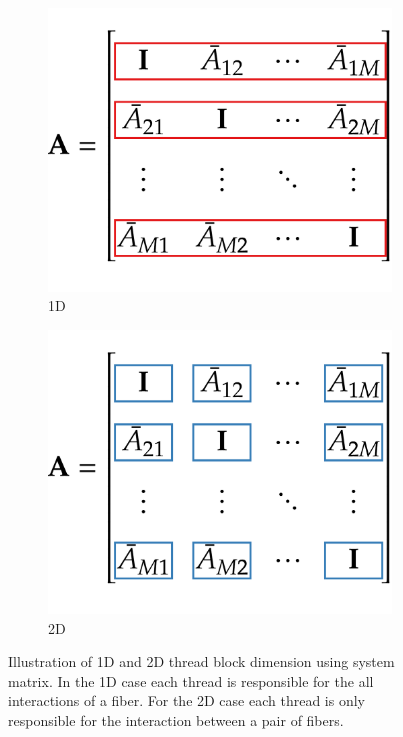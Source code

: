 \begin{figure}[!htbp]
  \centering
  \begin{subfigure}[h]{0.33\textwidth}
    \centering
    \includegraphics[width=\textwidth]{img/thread_block1D.pdf}
    \caption{1D}\label{fig:thread_block_1D}
  \end{subfigure}
  \begin{subfigure}[h]{0.33\textwidth}
    \centering
    \includegraphics[width=\textwidth]{img/thread_block2D.pdf}
    \caption{2D}\label{fig:thread_block_2D}
  \end{subfigure}
  \caption[Illustration of 1D and 2D thread block dimension using system matrix.]{Illustration of 1D and 2D thread block dimension using system matrix. In the 1D case each thread is responsible for the all interactions of a fiber. For the 2D case each thread is only responsible for the interaction between a pair of fibers.}
  \label{fig:thread_block}
\end{figure}

